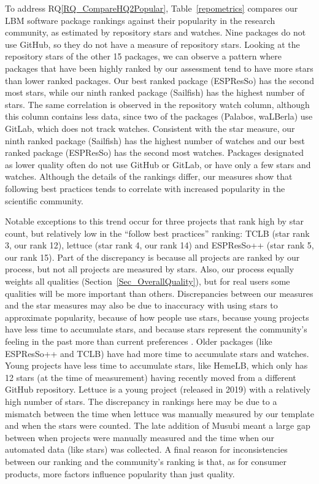 \documentclass[final, 3p, times, authoryear]{elsarticle}
\newcommand{\rqref}[1]{RQ\ref{#1}}
\begin{document}
To address \rqref{RQ_CompareHQ2Popular}, Table~\ref{repometrics} compares our
LBM software package rankings against their popularity in the research
community, as estimated by repository stars and watches. Nine packages do not
use GitHub, so they do not have a measure of repository stars. Looking at the
repository stars of the other 15 packages, we can observe a pattern where
packages that have been highly ranked by our assessment tend to have more stars
than lower ranked packages. Our best ranked package (ESPResSo) has the second
most stars, while our ninth ranked package (Sailfish) has the highest number of
stars. The same correlation is observed in the repository watch column, although
this column contains less data, since two of the packages (Palabos, waLBerla)
use GitLab, which does not track watches. Consistent with the star measure, our
ninth ranked package (Sailfish) has the highest number of watches and our best
ranked package (ESPResSo) has the second most watches. Packages designated as
lower quality often do not use GitHub or GitLab, or have only a few
stars and watches. Although the details of the rankings differ, our measures show
that following best practices tends to correlate with increased popularity in
the scientific community.

Notable exceptions to this trend occur for three projects that rank high by star
count, but relatively low in the ``follow best practices'' ranking: TCLB (star
rank 3, our rank 12), lettuce (star rank 4, our rank 14) and ESPResSo++ (star
rank 5, our rank 15).  Part of the discrepancy is because all projects are
ranked by our process, but not all projects are measured by stars.  Also, our
process equally weights all qualities (Section~\ref{Sec_OverallQuality}), but
for real users some qualities will be more important than others. Discrepancies
between our measures and the star measures may also be due to inaccuracy with
using stars to approximate popularity, because of how people use stars, because
young projects have less time to accumulate stars, and because stars represent
the community's feeling in the past more than current preferences
\citep{Szulik2017}. Older packages (like ESPResSo++ and TCLB) have had more time
to accumulate stars and watches. Young projects have less time to accumulate
stars, like HemeLB, which only has 12 stars (at the time of measurement) having
recently moved from a different GitHub repository.  Lettuce is a young project
(released in 2019) with a relatively high number of stars. The discrepancy in
rankings here may be due to a mismatch between the time when lettuce was
manually measured by our template and when the stars were counted. The late
addition of Musubi meant a large gap between when projects were manually
measured and the time when our automated data (like stars) was collected. A
final reason for inconsistencies between our ranking and the community's ranking
is that, as for consumer products, more factors influence popularity than just
quality.
\end{document}
